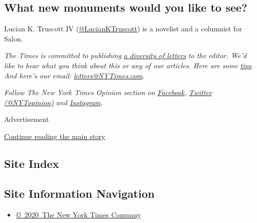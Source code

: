 \hypertarget{what-new-monuments-would-you-like-to-see}{%
\subsection{What new monuments would you like to
see?}\label{what-new-monuments-would-you-like-to-see}}

Lucian K. Truscott IV
(\href{https://twitter.com/LucianKTruscott}{@LucianKTruscott}) is a
novelist and a columnist for Salon.

\emph{The Times is committed to publishing}
\href{https://www.nytimes3xbfgragh.onion/2019/01/31/opinion/letters/letters-to-editor-new-york-times-women.html}{\emph{a
diversity of letters}} \emph{to the editor. We'd like to hear what you
think about this or any of our articles. Here are some}
\href{https://help.nytimes3xbfgragh.onion/hc/en-us/articles/115014925288-How-to-submit-a-letter-to-the-editor}{\emph{tips}}\emph{.
And here's our email:}
\href{mailto:letters@NYTimes.com}{\emph{letters@NYTimes.com}}\emph{.}

\emph{Follow The New York Times Opinion section on}
\href{https://www.facebookcorewwwi.onion/nytopinion}{\emph{Facebook}}\emph{,}
\href{http://twitter.com/NYTOpinion}{\emph{Twitter (@NYTopinion)}}
\emph{and}
\href{https://www.instagram.com/nytopinion/}{\emph{Instagram}}\emph{.}

Advertisement

\protect\hyperlink{after-bottom}{Continue reading the main story}

\hypertarget{site-index}{%
\subsection{Site Index}\label{site-index}}

\hypertarget{site-information-navigation}{%
\subsection{Site Information
Navigation}\label{site-information-navigation}}

\begin{itemize}
\tightlist
\item
  \href{https://help.nytimes3xbfgragh.onion/hc/en-us/articles/115014792127-Copyright-notice}{©~2020~The
  New York Times Company}
\end{itemize}

